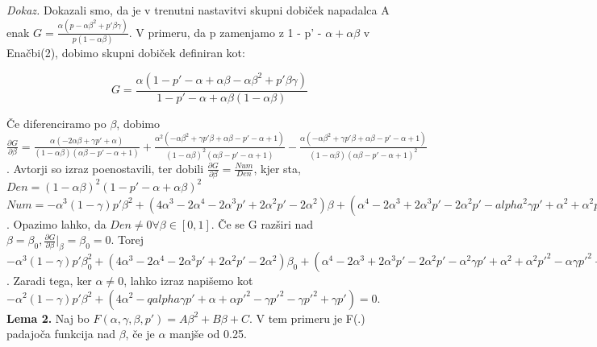 \documentclass[12pt]{article}
\begin{document}
\textit{Dokaz.} Dokazali smo, da je v trenutni nastavitvi skupni dobiček napadalca A enak $G = \frac{\alpha(p - \alpha\beta^2 + p'\beta\gamma)}{p(1 - \alpha\beta)}$. V primeru, da p zamenjamo z 1 - p' - $\alpha + \alpha\beta$ v Enačbi(2), dobimo skupni dobiček definiran kot:

\begin{equation}
G = \frac{\alpha(1 - p' - \alpha + \alpha\beta - \alpha\beta^2 + p' \beta\gamma)}{1 - p' - \alpha + \alpha\beta(1 - \alpha\beta)}
\end{equation}

Če diferenciramo po $\beta$, dobimo
$\frac{\partial G}{\partial\beta} = \frac{\alpha(-2\alpha\beta + \gamma p' + \alpha)}{(1 - \alpha\beta)(\alpha\beta - p' - \alpha + 1)} + \frac{\alpha^2(-\alpha\beta^2 + \gamma p'\beta + \alpha\beta - p' - \alpha + 1)}{(1 - \alpha\beta)^2(\alpha\beta - p' - \alpha + 1)} - \frac{\alpha(-\alpha\beta^2 + \gamma p'\beta + \alpha\beta - p' - \alpha + 1)}{(1 - \alpha\beta)(\alpha\beta - p' - \alpha + 1)^2}$. Avtorji so izraz poenostavili, ter dobili $\frac{\partial G}{\partial\beta} = \frac{Num}{Den}$, kjer sta, 
\newline
$Den = (1 - \alpha\beta)^2(1 - p' - \alpha + \alpha\beta)^2$
\newline
$Num = -\alpha^3(1 - \gamma)p'\beta^2 + (4\alpha^3 - 2 \alpha^4 - 2\alpha^3 p' + 2\alpha^2 p' - 2\alpha^2)\beta + (\alpha^4 - 2\alpha^3 + 2\alpha^3 p' - 2\alpha^2 p' - alpha^2\gamma p' + \alpha^2 + \alpha^2 p'^2 - \alpha\gamma p'^2 + \alpha\gamma p')$.
\newline
\newline
Opazimo lahko, da $Den \not= 0 \forall\beta \in [0, 1].$ Če se G razširi nad $\beta = \beta_0, \frac{\partial G}{\partial\beta}|_\beta=\beta_0 = 0$. Torej $-\alpha^3(1-\gamma)p' \beta_0^2 + (4\alpha^3 - 2\alpha^4 - 2\alpha^3 p' + 2\alpha^2 p' - 2\alpha^2)\beta_0 + (\alpha^4 - 2\alpha^3 + 2\alpha^3 p' - 2\alpha^2 p' - \alpha^2 \gamma p' + \alpha^2 + \alpha^2 p'^2 - \alpha\gamma p'^2 + \alpha\gamma p') = 0$. Zaradi tega, ker $\alpha \not= 0$, lahko izraz napišemo kot $-\alpha^2(1 - \gamma)p' \beta^2 + (4\alpha^2 - qalpha\gamma p' + \alpha + \alpha p'^2 - \gamma p'^2 - \gamma p'^2 + \gamma p') = 0$. 
\newline
\newline
\textbf{Lema 2.} Naj bo $ F(\alpha, \gamma, \beta, p') = A\beta^2 + B\beta + C $. V tem primeru je F(.) padajoča funkcija nad $ \beta $, če je $ \alpha $ manjše od 0.25.
\end{document}
